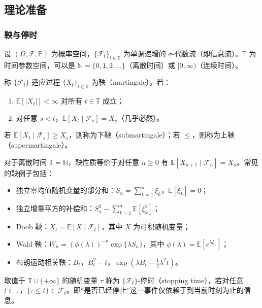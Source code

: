 \subsection{理论准备}

\subsubsection{鞅与停时}

设 $(\Omega, \mathcal{F}, \mathbb{P})$ 为概率空间，$\{\mathcal{F}_t\}_{t \in \mathbb{T}}$ 为单调递增的 $\sigma$-代数流（即信息流）。$\mathbb{T}$ 为时间参数空间，可以是 $\mathbb{N} = \{0,1,2,\dots\}$（离散时间）或 $[0, \infty)$（连续时间）。

\begin{definition}[鞅]\label{def:mg}
称 $\{\mathcal{F}_t\}$-适应过程 $\{X_t\}_{t \in \mathbb{T}}$ 为鞅（martingale），若：
\begin{enumerate}[noitemsep]
  \item $\mathbb{E}[|X_t|] < \infty$ 对所有 $t \in \mathbb{T}$ 成立；
  \item 对任意 $s < t$，$\mathbb{E}[X_t \mid \mathcal{F}_s] = X_s$（几乎必然）。
\end{enumerate}
若 $\mathbb{E}[X_t \mid \mathcal{F}_s] \geqslant X_s$，则称为下鞅（submartingale）；若 $\leqslant$，则称为上鞅（supermartingale）。
\end{definition}

对于离散时间 $\mathbb{T} = \mathbb{N}$，鞅性质等价于对任意 $n \geqslant 0$ 有 $\mathbb{E}[X_{n+1} \mid \mathcal{F}_n] = X_n$。常见的鞅例子包括：
\begin{itemize}[noitemsep]
  \item 独立零均值随机变量的部分和：$S_n = \sum_{k=1}^{n} \xi_k$，$\mathbb{E}[\xi_k] = 0$；
  \item 独立增量平方的补偿和：$S_n^2 - \sum_{k=1}^{n} \mathbb{E}[\xi_k^2]$；
  \item Doob 鞅：$X_t = \mathbb{E}[X \mid \mathcal{F}_t]$，其中 $X$ 为可积随机变量；
  \item Wald 鞅：$W_n = (\phi(\lambda))^{-n} \exp\{\lambda S_n\}$，其中 $\phi(\lambda) = \mathbb{E}[e^{\lambda \xi_1}]$；
  \item 布朗运动相关鞅：$B_t$，$B_t^2 - t$，$\exp(\lambda B_t - \frac{1}{2}\lambda^2 t)$。
\end{itemize}

\begin{definition}[停时]\label{def:stopping}
取值于 $\mathbb{T} \cup \{+\infty\}$ 的随机变量 $\tau$ 称为 $\{\mathcal{F}_t\}$-停时（stopping time），若对任意 $t \in \mathbb{T}$，$\{\tau \leqslant t\} \in \mathcal{F}_t$。即``是否已经停止''这一事件仅依赖于到当前时刻为止的信息。
\end{definition}

